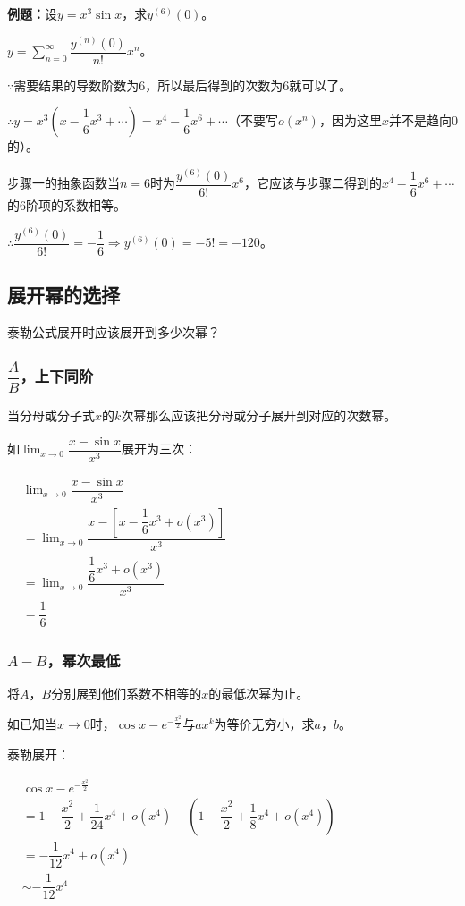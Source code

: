 \documentclass[UTF8, 12pt]{ctexart}
\begin{document}
\textbf{例题：}设$y=x^3\sin x$，求$y^{(6)}(0)$。

$y=\sum_{n=0}^\infty\dfrac{y^{(n)}(0)}{n!}x^n$。

$\because$需要结果的导数阶数为6，所以最后得到的次数为6就可以了。

$\therefore y=x^3\left(x-\dfrac{1}{6}x^3+\cdots\right)=x^4-\dfrac{1}{6}x^6+\cdots$（不要写$o(x^n)$，因为这里$x$并不是趋向0的）。

步骤一的抽象函数当$n=6$时为$\dfrac{y^{(6)}(0)}{6!}x^6$，它应该与步骤二得到的$x^4-\dfrac{1}{6}x^6+\cdots$的6阶项的系数相等。

$\therefore \dfrac{y^{(6)}(0)}{6!}=-\dfrac{1}{6}\Rightarrow y^{(6)}(0)=-5!=-120$。

\subsection{展开幂的选择}

泰勒公式展开时应该展开到多少次幂？

\subsubsection{\texorpdfstring{$\dfrac{A}{B}$}型，上下同阶}

当分母或分子式$x$的$k$次幂那么应该把分母或分子展开到对应的次数幂。

如$\lim_{x\to 0}\dfrac{x-\sin x}{x^3}$展开为三次：

$
\begin{aligned}
    & \lim_{x\to 0}\dfrac{x-\sin x}{x^3} \\
    & =\lim_{x\to 0}\dfrac{x-\left[x-\dfrac{1}{6}x^3+o(x^3)\right]}{x^3} \\
    & =\lim_{x\to 0}\dfrac{\dfrac{1}{6}x^3+o(x^3)}{x^3} \\
    & =\dfrac{1}{6}
\end{aligned}
$

\subsubsection{\texorpdfstring{$A-B$}型，幂次最低}

将$A$，$B$分别展到他们系数不相等的$x$的最低次幂为止。

如已知当$x\to 0$时，$\cos x-e^{-\frac{x^2}{2}}$与$ax^k$为等价无穷小，求$a$，$b$。

泰勒展开：

$
\begin{aligned}
    & \cos x-e^{-\frac{x^2}{2}} \\
    & = 1-\dfrac{x^2}{2}+\dfrac{1}{24}x^4+o(x^4)-\left(1-\dfrac{x^2}{2}+\dfrac{1}{8}x^4+o(x^4)\right) \\
    & = -\dfrac{1}{12}x^4+o(x^4) \\
    & \sim -\dfrac{1}{12}x^4
\end{aligned}
$
\end{document}
